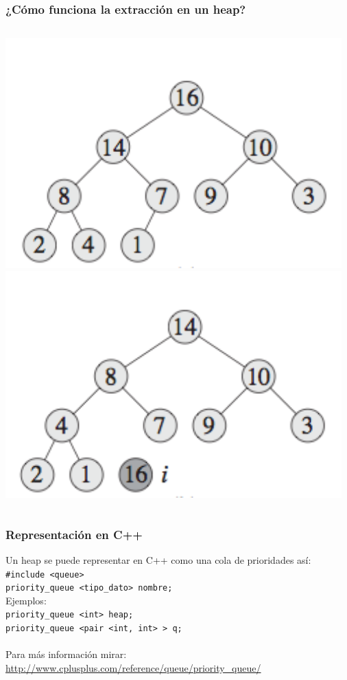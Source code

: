 \documentclass{beamer}
\begin{document}
	\begin{frame}
		\frametitle{¿Cómo funciona la extracción en un heap?}
		\begin{columns}
			\includegraphics[width = 1\textwidth]{heap.png}
			\includegraphics[width = 1\textwidth]{heap_delete.png}
		\end{columns}
	\end{frame}
	
	
	\begin{frame}[fragile]
		\frametitle{Representación en C++}
		Un heap se puede representar en C++ como una cola de prioridades así:
		\verb|#include <queue>|\\
		\verb|priority_queue <tipo_dato> nombre;|\\
		Ejemplos:\\
		\verb|priority_queue <int> heap;|\\
		\verb|priority_queue <pair <int, int> > q;|\\
		\quad \\
		Para más información mirar: \url{http://www.cplusplus.com/reference/queue/priority_queue/}
	\end{frame}
	
\end{document}
